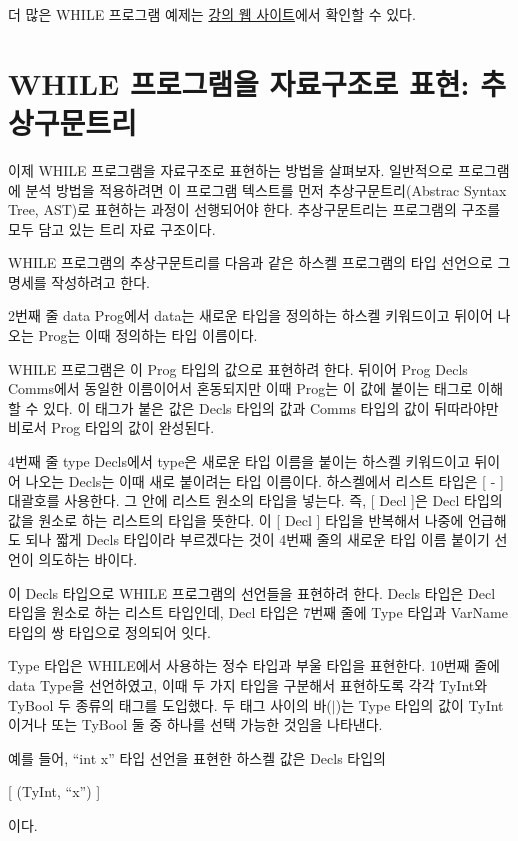 \documentclass[a4paper]{book}
\begin{document}
더 많은 WHILE 프로그램 예제는
\href{https://github.com/kwanghoon/Lecture_SAV/tree/master/whilelang/example}{강의
  웹 사이트}에서 확인할 수 있다.

\section{WHILE 프로그램을 자료구조로 표현: 추상구문트리}

이제 WHILE 프로그램을 자료구조로 표현하는 방법을 살펴보자. 일반적으로
프로그램에 분석 방법을 적용하려면 이 프로그램 텍스트를 먼저
추상구문트리(Abstrac Syntax Tree, AST)로 표현하는 과정이 선행되어야
한다. 추상구문트리는 프로그램의 구조를 모두 담고 있는 트리 자료
구조이다.

WHILE 프로그램의 추상구문트리를 다음과 같은 하스켈 프로그램의 타입
선언으로 그 명세를 작성하려고 한다.

2번째 줄 data Prog에서 data는 새로운 타입을 정의하는 하스켈 키워드이고
뒤이어 나오는 Prog는 이때 정의하는 타입 이름이다.

WHILE 프로그램은 이 Prog 타입의 값으로 표현하려 한다. 뒤이어 Prog
Decls Comms에서 동일한 이름이어서 혼동되지만 이때 Prog는 이 값에
붙이는 태그로 이해할 수 있다.  이 태그가 붙은 값은 Decls 타입의 값과
Comms 타입의 값이 뒤따라야만 비로서 Prog 타입의 값이 완성된다.

4번째 줄 type Decls에서 type은 새로운 타입 이름을 붙이는 하스켈
키워드이고 뒤이어 나오는 Decls는 이때 새로 붙이려는 타입 이름이다.
하스켈에서 리스트 타입은 [ - ] 대괄호를 사용한다. 그 안에 리스트
원소의 타입을 넣는다. 즉, [ Decl ]은 Decl 타입의 값을 원소로 하는
리스트의 타입을 뜻한다. 이 [ Decl ] 타입을 반복해서 나중에 언급해도
되나 짧게 Decls 타입이라 부르겠다는 것이 4번째 줄의 새로운 타입 이름
붙이기 선언이 의도하는 바이다.

이 Decls 타입으로 WHILE 프로그램의 선언들을 표현하려 한다. Decls
타입은 Decl 타입을 원소로 하는 리스트 타입인데, Decl 타입은 7번째 줄에
Type 타입과 VarName 타입의 쌍 타입으로 정의되어 잇다.

Type 타입은 WHILE에서 사용하는 정수 타입과 부울 타입을 표현한다.
10번째 줄에 data Type을 선언하였고, 이때 두 가지 타입을 구분해서
표현하도록 각각 TyInt와 TyBool 두 종류의 태그를 도입했다. 두 태그
사이의 바($|$)는 Type 타입의 값이 TyInt이거나 또는 TyBool 둘 중 하나를
선택 가능한 것임을 나타낸다.

예를 들어, ``int x'' 타입 선언을 표현한 하스켈 값은 Decls 타입의
\begin{center}
  [ (TyInt, ``x'') ]
\end{center}
이다.
\end{document}
